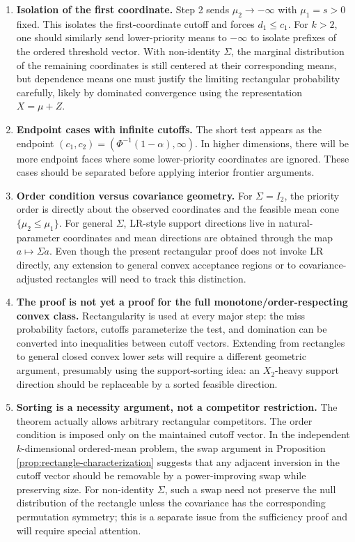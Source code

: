 \documentclass[12pt]{article}
\theoremstyle{definition}
\theoremstyle{remark}
\begin{document}
\begin{enumerate}[label=\textbf{(E\arabic*)},leftmargin=2.4em]
\item \textbf{Isolation of the first coordinate.}
Step 2 sends $\mu_2\to-\infty$ with $\mu_1=s>0$ fixed. This isolates the first-coordinate cutoff and forces $d_1\le c_1$. For $k>2$, one should similarly send lower-priority means to $-\infty$ to isolate prefixes of the ordered threshold vector. With non-identity $\Sigma$, the marginal distribution of the remaining coordinates is still centered at their corresponding means, but dependence means one must justify the limiting rectangular probability carefully, likely by dominated convergence using the representation $X=\mu+Z$.

\item \textbf{Endpoint cases with infinite cutoffs.}
The short test appears as the endpoint $(c_1,c_2)=(\Phi^{-1}(1-\alpha),\infty)$. In higher dimensions, there will be more endpoint faces where some lower-priority coordinates are ignored. These cases should be separated before applying interior frontier arguments.

\item \textbf{Order condition versus covariance geometry.}
For $\Sigma=I_2$, the priority order is directly about the observed coordinates and the feasible mean cone $\{\mu_2\le\mu_1\}$. For general $\Sigma$, LR-style support directions live in natural-parameter coordinates and mean directions are obtained through the map $a\mapsto\Sigma a$. Even though the present rectangular proof does not invoke LR directly, any extension to general convex acceptance regions or to covariance-adjusted rectangles will need to track this distinction.

\item \textbf{The proof is not yet a proof for the full monotone/order-respecting convex class.}
Rectangularity is used at every major step: the miss probability factors, cutoffs parameterize the test, and domination can be converted into inequalities between cutoff vectors. Extending from rectangles to general closed convex lower sets will require a different geometric argument, presumably using the support-sorting idea: an $X_2$-heavy support direction should be replaceable by a sorted feasible direction.

\item \textbf{Sorting is a necessity argument, not a competitor restriction.}
The theorem actually allows arbitrary rectangular competitors. The order condition is imposed only on the maintained cutoff vector. In the independent $k$-dimensional ordered-mean problem, the swap argument in Proposition \ref{prop:rectangle-characterization} suggests that any adjacent inversion in the cutoff vector should be removable by a power-improving swap while preserving size. For non-identity $\Sigma$, such a swap need not preserve the null distribution of the rectangle unless the covariance has the corresponding permutation symmetry; this is a separate issue from the sufficiency proof and will require special attention.
\end{enumerate}
\end{document}
